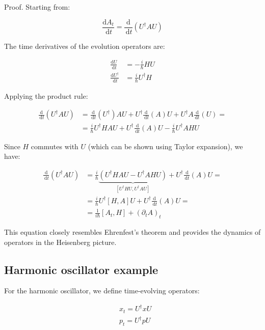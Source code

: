 \documentclass[italian]{HKNdocument}
\begin{document}
Proof. Starting from:

\begin{equation}
\frac{\mathrm{d} A_{t}}{\, \mathrm{d} t}=\frac{\mathrm{d}}{\, \mathrm{d} t}\left(U^{\dagger} A U\right)
\end{equation}

The time derivatives of the evolution operators are:

\begin{align}
\frac{\mathrm{d} U}{\, \mathrm{d} t} & =-\frac{i}{\hbar} H U \\
\frac{\mathrm{d} U^{\dagger}}{\, \mathrm{d} t} & =\frac{i}{\hbar} U^{\dagger} H
\end{align}

Applying the product rule:

\begin{align}
\frac{\mathrm{d}}{\, \mathrm{d} t}\left(U^{\dagger} A U\right) & =\frac{\mathrm{d}}{\, \mathrm{d} t}\left(U^{\dagger}\right) A U+U^{\dagger} \frac{\mathrm{d}}{\, \mathrm{d} t}(A) U+U^{\dagger} A \frac{\, \mathrm{d}}{\, \mathrm{d} t}(U)=  \\
& =\frac{i}{\hbar} U^{\dagger} H A U+U^{\dagger} \frac{\, \mathrm{d}}{\, \mathrm{d} t}(A) U-\frac{i}{\hbar} U^{\dagger} A H U
\end{align}

Since $H$ commutes with $U$ (which can be shown using Taylor expansion), we have:

\begin{align}
\frac{\mathrm{d}}{\, \mathrm{d} t}\left(U^{\dagger} A U\right) & =\frac{i}{\hbar} \underbrace{\left(U^{\dagger} H A U-U^{\dagger} A H U\right)}_{\left[U^{\dagger}HU, U^{\dagger}AU\right]}+U^{\dagger} \frac{\, \mathrm{d}}{\, \mathrm{d} t}(A) U= \\
& =\frac{i}{\hbar} U^{\dagger}[H,A]U + U^{\dagger} \frac{\mathrm{d}}{\, \mathrm{d} t}(A) U= \\
& =\frac{1}{i \hbar}\left[A_{t}, H\right]+\left(\partial_{t} A\right)_{t}
\end{align}

This equation closely resembles Ehrenfest's theorem and provides the dynamics of operators in the Heisenberg picture.

\subsection{Harmonic oscillator example}
For the harmonic oscillator, we define time-evolving operators:

\begin{align}
& x_{t}=U^{\dagger} x U \\
& p_{t}=U^{\dagger} p U
\end{align}
\end{document}
